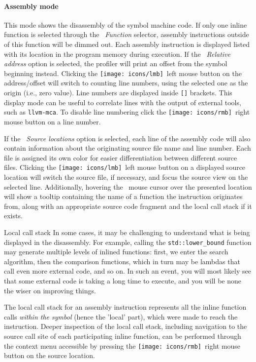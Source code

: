 \documentclass[hidelinks,titlepage,a4paper,twoside]{article}
\newcommand{\LMB}{\texttt{[image: icons/lmb]}}
\newcommand{\RMB}{\texttt{[image: icons/rmb]}}
\begin{document}
\paragraph{Assembly mode}

This mode shows the disassembly of the symbol machine code. If only one inline function is selected through the \emph{\faSitemap{}~Function} selector, assembly instructions outside of this function will be dimmed out. Each assembly instruction is displayed listed with its location in the program memory during execution. If the \emph{\faSearchLocation{}~Relative address} option is selected, the profiler will print an offset from the symbol beginning instead. Clicking the \LMB{}~left mouse button on the address/offset will switch to counting line numbers, using the selected one as the origin (i.e., zero value). Line numbers are displayed inside \texttt{[]} brackets. This display mode can be useful to correlate lines with the output of external tools, such as \texttt{llvm-mca}. To disable line numbering click the \RMB{}~right mouse button on a line number.

If the \emph{\faFileImport{}~Source locations} option is selected, each line of the assembly code will also contain information about the originating source file name and line number. Each file is assigned its own color for easier differentiation between different source files. Clicking the \LMB{}~left mouse button on a displayed source location will switch the source file, if necessary, and focus the source view on the selected line. Additionally, hovering the \faMousePointer{}~mouse cursor over the presented location will show a tooltip containing the name of a function the instruction originates from, along with an appropriate source code fragment and the local call stack if it exists.

\begin{bclogo}[
noborder=true,
couleur=black!5,
logo=\bclampe
]{Local call stack}
In some cases, it may be challenging to understand what is being displayed in the disassembly. For example, calling the \texttt{std::lower\_bound} function may generate multiple levels of inlined functions: first, we enter the search algorithm, then the comparison functions, which in turn may be lambdas that call even more external code, and so on. In such an event, you will most likely see that some external code is taking a long time to execute, and you will be none the wiser on improving things.

The local call stack for an assembly instruction represents all the inline function calls \emph{within the symbol} (hence the 'local' part), which were made to reach the instruction. Deeper inspection of the local call stack, including navigation to the source call site of each participating inline function, can be performed through the context menu accessible by pressing the \RMB{}~right mouse button on the source location.
\end{bclogo}
\end{document}
